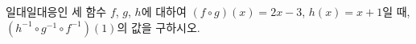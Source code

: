 일대일대응인 세 함수 $f$, $g$, $h$에 대하여 $(f\circ g)(x)=2x-3$, $h(x)=x+1$일 때, $(h^{-1}\circ g^{-1}\circ f^{-1})(1)$의 값을 구하시오.
